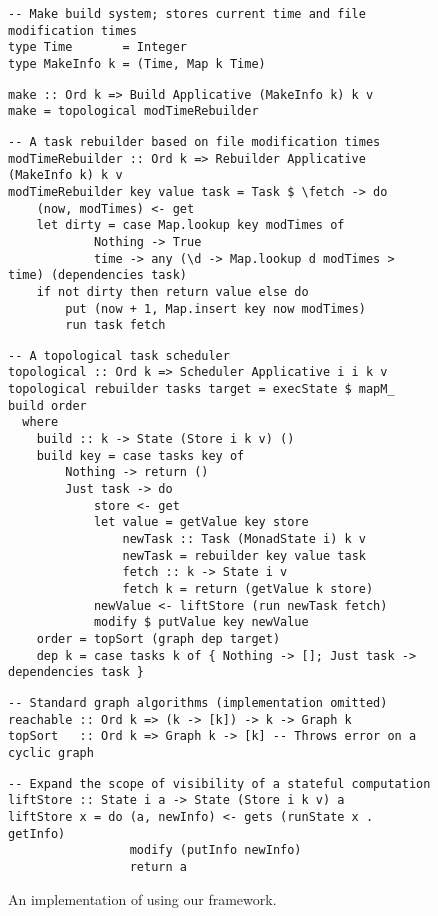 \begin{figure}
\begin{verbatim}
-- Make build system; stores current time and file modification times
type Time       = Integer
type MakeInfo k = (Time, Map k Time)
\end{verbatim}
\vspace{0mm}
\begin{verbatim}
make :: Ord k => Build Applicative (MakeInfo k) k v
make = topological modTimeRebuilder
\end{verbatim}
\vspace{0mm}
\begin{verbatim}
-- A task rebuilder based on file modification times
modTimeRebuilder :: Ord k => Rebuilder Applicative (MakeInfo k) k v
modTimeRebuilder key value task = Task $ \fetch -> do
    (now, modTimes) <- get
    let dirty = case Map.lookup key modTimes of
            Nothing -> True
            time -> any (\d -> Map.lookup d modTimes > time) (dependencies task)
    if not dirty then return value else do
        put (now + 1, Map.insert key now modTimes)
        run task fetch
\end{verbatim}
\vspace{0mm}
\begin{verbatim}
-- A topological task scheduler
topological :: Ord k => Scheduler Applicative i i k v
topological rebuilder tasks target = execState $ mapM_ build order
  where
    build :: k -> State (Store i k v) ()
    build key = case tasks key of
        Nothing -> return ()
        Just task -> do
            store <- get
            let value = getValue key store
                newTask :: Task (MonadState i) k v
                newTask = rebuilder key value task
                fetch :: k -> State i v
                fetch k = return (getValue k store)
            newValue <- liftStore (run newTask fetch)
            modify $ putValue key newValue
    order = topSort (graph dep target)
    dep k = case tasks k of { Nothing -> []; Just task -> dependencies task }
\end{verbatim}
\vspace{0mm}
\begin{verbatim}
-- Standard graph algorithms (implementation omitted)
reachable :: Ord k => (k -> [k]) -> k -> Graph k
topSort   :: Ord k => Graph k -> [k] -- Throws error on a cyclic graph
\end{verbatim}
\vspace{0mm}
\begin{verbatim}
-- Expand the scope of visibility of a stateful computation
liftStore :: State i a -> State (Store i k v) a
liftStore x = do (a, newInfo) <- gets (runState x . getInfo)
                 modify (putInfo newInfo)
                 return a
\end{verbatim}
\vspace{-3mm}
\caption{An implementation of \Make using our framework.}\label{fig-make-implementation}
\vspace{-3mm}
\end{figure}

